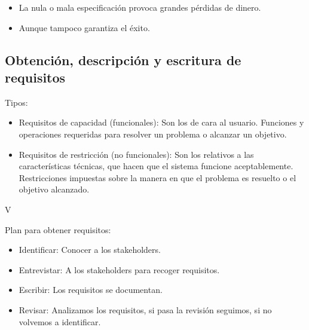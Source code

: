 \documentclass[12pt, twoside, openright]{report} %
\begin{document}
\begin{itemize}
	\item La nula o mala especificación provoca grandes pérdidas de dinero.
	\item Aunque tampoco garantiza el éxito.
\end{itemize}

\subsection{Obtención, descripción y escritura de requisitos}

Tipos:
\begin{itemize}
	\item Requisitos de capacidad (funcionales): Son los de cara al usuario.
	      Funciones y operaciones requeridas para resolver un problema o
	      alcanzar un objetivo.
	\item Requisitos de restricción (no funcionales): Son los relativos a
	      las características técnicas, que hacen que el sistema funcione
	      aceptablemente. Restricciones impuestas sobre la manera en que el
	      problema es resuelto o el objetivo alcanzado.
\end{itemize}

V
\begin{figure}[H]
	{\def\svgwidth{.8\textwidth}
		}
\end{figure}

Plan para obtener requisitos:
\begin{itemize}
	\item Identificar: Conocer a los stakeholders.
	\item Entrevistar: A los stakeholders para recoger requisitos.
	\item Escribir: Los requisitos se documentan.
	\item Revisar: Analizamos los requisitos, si pasa la revisión seguimos,
	      si no volvemos a identificar.
\end{itemize}
\end{document}
